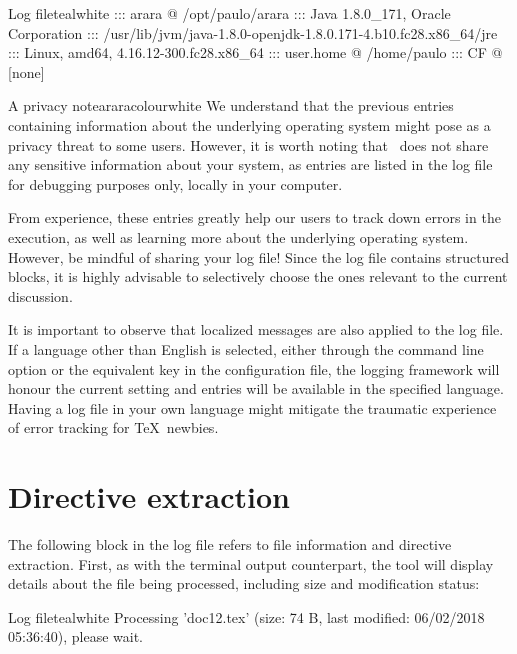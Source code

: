 \begin{codebox}{Log file}{teal}{\icnote}{white}
::: arara @ /opt/paulo/arara
::: Java 1.8.0_171, Oracle Corporation
::: /usr/lib/jvm/java-1.8.0-openjdk-1.8.0.171-4.b10.fc28.x86_64/jre
::: Linux, amd64, 4.16.12-300.fc28.x86_64
::: user.home @ /home/paulo
::: CF @ [none]
\end{codebox}

\begin{messagebox}{A privacy note}{araracolour}{\icok}{white}
\setlength{\parskip}{1em}
We understand that the previous entries containing information about the underlying operating system might pose as a privacy threat to some users. However, it is worth noting that \arara\ does not share any sensitive information about your system, as entries are listed in the log file for debugging purposes only, locally in your computer.

From experience, these entries greatly help our users to track down errors in the execution, as well as learning more about the underlying operating system. However, be mindful of sharing your log file! Since the log file contains structured blocks, it is highly advisable to selectively choose the ones relevant to the current discussion.
\end{messagebox}

It is important to observe that localized messages are also applied to the log file. If a language other than English is selected, either through the  command line option or the equivalent key in the configuration file, the logging framework will honour the current setting and entries will be available in the specified language. Having a log file in your own language might mitigate the traumatic experience of error tracking for \TeX\ newbies.

\section{Directive extraction}
\label{sec:directiveextraction}

The following block in the log file refers to file information and directive extraction. First, as with the terminal output counterpart, the tool will display details about the file being processed, including size and modification status:

\begin{codebox}{Log file}{teal}{\icnote}{white}
Processing 'doc12.tex' (size: 74 B, last modified:
06/02/2018 05:36:40), please wait.
\end{codebox}


